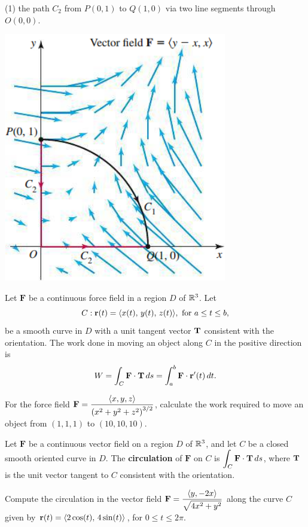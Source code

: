 \documentclass[mathNotesPreamble]{subfiles}
\begin{document}
  \begin{tasks}[after-item-skip=\stretch{1}, label=\alph*), resume](1)
    \task 
      the path $C_2$ from $P(0,1)$ to $Q(1,0)$ via two line segments through $O(0,0)$.
  \end{tasks}
  \begin{flushright}
    \includegraphics[width=0.3\linewidth]{images/briggs_17_02/fig17_20}
  \end{flushright}
  \pagebreak

  \begin{defn*}
    Let $\mathbf F$ be a continuous force field in a region $D$ of $\mathbb{R}^3$. Let
      \[C: {\mathbf{r}}(t)={\left\langle x(t),\,y(t),\,z(t) \right\rangle}, \textnormal{ for } a\leq t\leq b,\]
    be a smooth curve in $D$ with a unit tangent vector ${\mathbf{T}}$ consistent with the orientation. The work done in moving an object along $C$ in the positive direction is
      \[W=\int_C \mathbf F\cdot{\mathbf{T}}\,ds=\int_a^b \mathbf F\cdot{\mathbf{r}}'(t)\,dt.\]
  \end{defn*}
  \begin{ex*}
    For the force field $\mathbf F=\dfrac{{\left\langle x,y,z \right\rangle}}{{\left(x^2+y^2+z^2\right)}^{3/2}}$, calculate the work required to move an object from $(1,1,1)$ to $(10,10,10)$.
  \end{ex*}
  \pagebreak

  \begin{defn*}[Circulation]
    Let $\mathbf F$ be a continuous vector field on a region $D$ of $\mathbb{R}^3$, and let $C$ be a closed smooth oriented curve in $D$. The \textbf{circulation} of $\mathbf F$ on $C$ is $\displaystyle\int_C \mathbf F\cdot{\mathbf{T}}\,ds$, where ${\mathbf{T}}$ is the unit vector tangent to $C$ consistent with the orientation. 
  \end{defn*}

  \begin{ex*}
    Compute the circulation in the vector field $\mathbf F=\dfrac{{\left\langle y,-2x \right\rangle}}{\sqrt{4x^2+y^2}}$ along the curve $C$ given by ${\mathbf{r}}(t)={\left\langle 2\cos(t),\,4\sin(t) \right\rangle}$, for $0\leq t\leq 2\pi$.
  \end{ex*}
  \pagebreak
\end{document}
